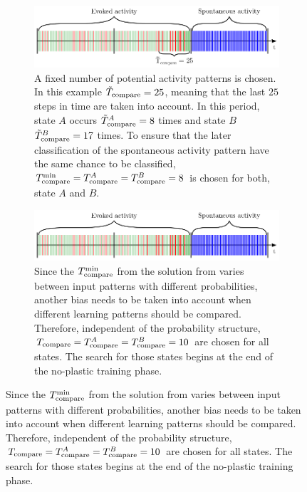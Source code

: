 \begin{figure}
    \centering
    \begin{subfigure}{\textwidth}
    	\centering
        \includegraphics[width=\textwidth]{methods/classification_old}
        \vspace{5pt}
        \caption{A fixed number of potential activity patterns is chosen. In this example $\tilde{T}_{\text{compare}} = 25$, meaning that the last $25$ steps in time are taken into account. In this period, state $A$ occurs $\tilde{T}_{\text{compare}}^A = 8$ times and state $B$ $\tilde{T}_{\text{compare}}^B = 17$ times. To ensure that the later classification of the spontaneous activity pattern have the same chance to be classified, $T_{\text{compare}}^{\text{min}} = T_{\text{compare}}^A = T_{\text{compare}}^B = 8$ is chosen for both, state $A$ and $B$.}
        \vspace{20pt}
        \label{fig:classification-old}
    \end{subfigure}
    \begin{subfigure}{\textwidth}
    	\centering
        \includegraphics[width=\textwidth]{methods/classification_new}
        \vspace{5pt}
        \caption{Since the $T_{\text{compare}}^{\text{min}}$ from the solution from \textcite{hartmann2015s} varies between input patterns with different probabilities, another bias needs to be taken into account when different learning patterns should be compared. Therefore, independent of the probability structure, $T_{\text{compare}} = T_{\text{compare}}^A = T_{\text{compare}}^B = 10$ are chosen for all states. The search for those states begins at the end of the no-plastic training phase.}
        \vspace{20pt}
        \label{fig:classification-new}
    \end{subfigure}

\end{figure}
